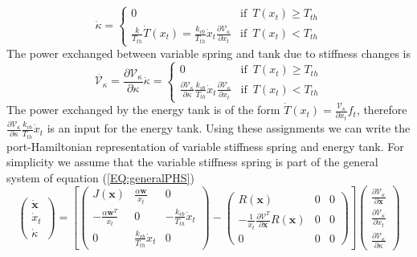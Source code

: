 \documentclass[a4paper,twoside, openright,12pt]{report}
\newcommand{\f}[1]{\boldsymbol{#1}}
\begin{document}
\begin{equation}
\dot{\kappa} = \begin{cases}
0 & \text{if } \, T(x_t)\geq T_{th} \\
\frac{k}{T_{th}}\dot{T}(x_t) = \frac{k_{vb}}{T_{th}} \dot{x}_t \frac{\partial \mathcal{V}_{\kappa}}{\partial x_t} & \text{if }  \, T(x_t) < T_{th}
\end{cases}
\end{equation}
The power exchanged between variable spring and tank due to stiffness changes is
\begin{equation}
\dot{\mathcal{V}_{\kappa}} = \frac{\partial \mathcal{V}_{\kappa}}{\partial \kappa}\dot{\kappa} =
\begin{cases}
0 & \text{if } \, T(x_t)\geq T_{th} \\
\frac{\partial \mathcal{V}_{\kappa}}{\partial \kappa}\frac{k_{vb}}{T_{th}} \dot{x}_t \frac{\partial \mathcal{V_{\kappa}}}{\partial x_t} & \text{if }  \, T(x_t) < T_{th}
\end{cases}
\end{equation}
The power exchanged by the energy tank is of the form $\dot{T}(x_t) = \frac{\mathcal{V}_{\kappa}}{\partial x_t}f_t$, therefore $\frac{\partial \mathcal{V}_{\kappa}}{\partial \kappa}\frac{k_{vb}}{T_{th}} \dot{x}_t$ is an input for the energy tank. Using these assignments we can write the port-Hamiltonian representation of variable stiffness spring and energy tank. For simplicity we assume that the variable stiffness spring is part of the general system of equation (\ref{EQ:generalPHS})
\begin{equation}
\begin{pmatrix}
\dot{\f{x}} \\ \dot{x}_t \\ \dot{\kappa}
\end{pmatrix} =
\left[
\begin{pmatrix}
J(\f{x}) & \frac{\alpha \f{w}}{x_t} & 0\\ -\frac{\alpha \f{w}^T}{x_t} & 0 & -\frac{k_{vb}}{T_{th}}\dot{x}_t \\ 0 & \frac{k_{vb}}{T_{th}}\dot{x}_t & 0\end{pmatrix}
- 
\begin{pmatrix}
R(\f{x}) & 0 & 0\\ -\frac{1}{x_t}\frac{\partial \mathcal{V}^T}{\partial \f{x}}R(\f{x}) & 0 & 0 \\ 0 & 0 & 0
\end{pmatrix}
\right]
\begin{pmatrix}
\frac{\partial \mathcal{V}_{\kappa}}{\partial \f{x}} \\
\frac{\partial \mathcal{V}_{\kappa}}{\partial x_t} \\
\frac{\partial \mathcal{V}_{\kappa}}{\partial \kappa} 
\end{pmatrix}
\end{equation}
\end{document}
